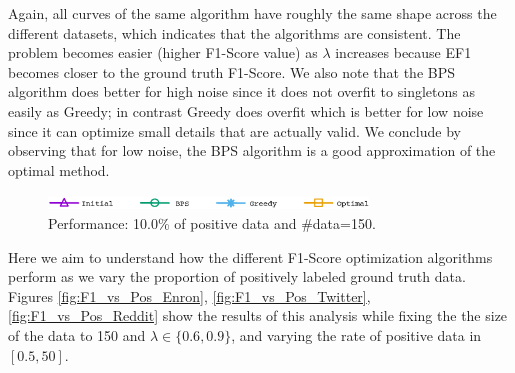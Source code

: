 Again, all curves of the same algorithm have roughly the same shape across the different datasets, which indicates that the algorithms are consistent. 
The problem becomes easier (higher F1-Score value) as $\lambda$ increases because EF1 becomes closer to the ground truth F1-Score.  
We also note that the BPS algorithm does better for high noise since it does not overfit to singletons as easily as Greedy; in contrast Greedy does overfit which is better for low noise since it can optimize small details that are actually valid. We conclude by observing that for low noise, the BPS algorithm is a good approximation of the optimal method.


\begin{figure}[H]
\begin{centering}
\includegraphics[width=8.5cm]{imgs/legend1}
\par\end{centering}
\begin{centering}
\par\end{centering}
\caption{Performance: 10.0\% of positive data and \#data=150.}
\label{fig:F1_vs_Lambda}
\end{figure}




 Here we aim to understand how the different F1-Score optimization algorithms perform as we vary the proportion of positively labeled ground truth data.
Figures \ref{fig:F1_vs_Pos_Enron}, \ref{fig:F1_vs_Pos_Twitter}, \ref{fig:F1_vs_Pos_Reddit} show the results of this analysis while fixing the  the size of the data to 150 and $\lambda\in \{0.6,0.9\}$, and varying the rate of positive data in $[0.5,50]$.




